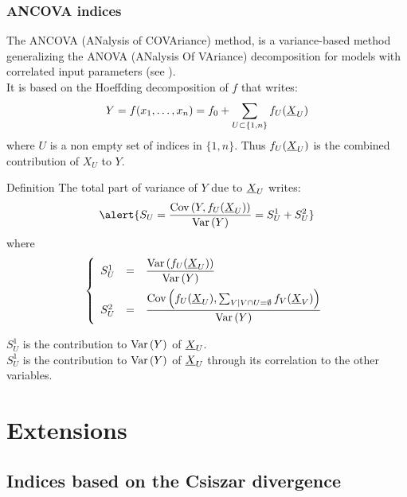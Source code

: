 \documentclass[8pt]{beamer}
\begin{document}
\begin{frame}
  \frametitle{ANCOVA indices}
\small

The  \alert{ANCOVA} (ANalysis of COVAriance) method, is a variance-based method generalizing the ANOVA (ANalysis Of VAriance) decomposition for models with correlated input parameters (see \cite{Caniou2012}).\\
It is based on the Hoeffding decomposition of $f$ that writes:
\begin{equation}
 Y = f(x_1, \dots, x_n) = f_0 + \sum_{U \subset \{ 1, n\}} f_U({\underline{X}}_U)
\end{equation}
where $U$ is a non empty set of indices in $\{ 1, n\}$. Thus $f_U({\underline{X}}_U)$ is the combined contribution of  $X_U$ to $Y$.

\begin{block}{Definition}
The total part of variance of $Y$ due to ${\underline{X}}_U$ writes:
\begin{align*}
 \alert{S_U = \dfrac{\Cov{Y, f_U(\vect{X}_U)}}{\Var{Y}} = S_U^{1} + S_U^{2}}
\end{align*}
 where
$$
 \left\{
 \begin{array}{lcl}
  S_U^{1} & = & \dfrac{\mbox{Var}\left( f_U({\underline{X}}_U) \right)}{\mbox{Var}\left( Y \right)} \\[1em]
  S_U^{2} & = & \dfrac{\mbox{Cov}\left( f_U({\underline{X}}_U), \sum_{V | V \cap U = \emptyset} f_V({\underline{X}}_V) \right)}{\mbox{Var}\left( Y \right)}
  \end{array}
  \right.
$$

\alert{
$S_U^{1}$ is the contribution to $\mbox{Var}\left( Y \right)$ of ${\underline{X}}_U$.\\
$S_U^{1}$ is the contribution to $\mbox{Var}\left( Y \right)$ of ${\underline{X}}_U$ through its correlation to the other variables.
}
\end{block}

\end{frame}




\section{Extensions}

\subsection{Indices based on the Csiszar divergence}
\end{document}

